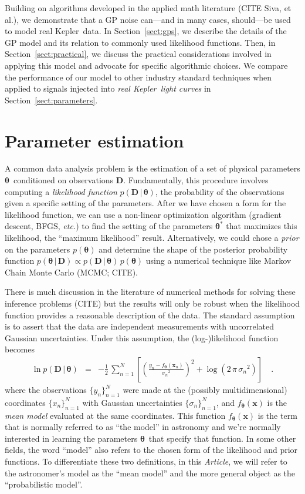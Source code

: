 \documentclass[12pt,preprint]{aastex}
\newcommand{\project}[1]{{\sffamily #1}}
\newcommand{\kepler}{\project{Kepler}}
\newcommand{\paper}{\emph{Article}}
\newcommand{\foreign}[1]{\emph{#1}}
\newcommand{\etc}{\foreign{etc.}}
\newcommand{\eqlabel}[1]{\label{eq:#1}}
\newcommand{\Sect}[1]{Section~\ref{sect:#1}}
\newcommand{\sect}[1]{\Sect{#1}}
\newcommand{\sectlabel}[1]{\label{sect:#1}}
\newcommand{\bvec}[1]{{\ensuremath{\boldsymbol{#1}}}}
\newcommand{\params}{{\ensuremath{\boldsymbol{\theta}}}}
\newcommand{\data}{{\ensuremath{\boldsymbol{D}}}}
\begin{document}
Building on algorithms developed in the applied math literature (CITE Siva, et
al.), we demonstrate that a GP noise can---and in many cases, should---be
used to model real \kepler\ data.
In \sect{gps}, we describe the details of the GP model and its relation to
commonly used likelihood functions.
Then, in \sect{practical}, we discuss the practical considerations involved in
applying this model and advocate for specific algorithmic choices.
We compare the performance of our model to other industry standard techniques
when applied to signals injected into \emph{real \kepler\ light curves} in
\sect{parameters}.

\section{Parameter estimation}
\sectlabel{parameter-est}

A common data analysis problem is the estimation of a set of physical
parameters \params\ conditioned on observations \data.
Fundamentally, this procedure involves computing a \emph{likelihood function}
$p(\data\,|\,\params)$, the probability of the observations given a specific
setting of the parameters.
After we have chosen a form for the likelihood function, we can use a
non-linear optimization algorithm (gradient descent, BFGS, \etc) to find the
setting of the parameters $\params^*$ that maximizes this likelihood, the
``maximum likelihood'' result.
Alternatively, we could chose a \emph{prior} on the parameters $p(\params)$
and determine the shape of the posterior probability function
$p(\params\,|\,\data) \propto p(\data\,|\,\params)\,p(\params)$ using a
numerical technique like Markov Chain Monte Carlo (MCMC; CITE).

There is much discussion in the literature of numerical methods for solving
these inference problems (CITE) but the results will only be robust when the
likelihood function provides a reasonable description of the data.
The standard assumption is to assert that the data are independent
measurements with uncorrelated Gaussian uncertainties.
Under this assumption, the (log-)likelihood function becomes
\begin{eqnarray}\eqlabel{gauss-lnlike}
\ln p (\data\,|\,\params) &=&
-\frac{1}{2} \, \sum_{n=1}^N \left [
    \left(\frac{y_n - f_\params(\bvec{x}_n)}{{\sigma_n}^2}\right)^2
    + \log (2\,\pi\,{\sigma_n}^2)\right ] \quad.
\end{eqnarray}
where the observations $\{y_n\}_{n=1}^N$ were made at the (possibly
multidimensional) coordinates $\{x_n\}_{n=1}^N$ with Gaussian uncertainties
$\{\sigma_n\}_{n=1}^N$, and $f_\params(\bvec{x})$ is the \emph{mean model}
evaluated at the same coordinates.
This function $f_\params(\bvec{x})$ is the term that is normally referred to
as ``the model'' in astronomy and we're normally interested in learning the
parameters \params\ that specify that function.
In some other fields, the word ``model'' also refers to the chosen form of the
likelihood and prior functions.
To differentiate these two definitions, in this \paper, we will refer to the
astronomer's model as the ``mean model'' and the more general object as the
``probabilistic model''.
\end{document}
